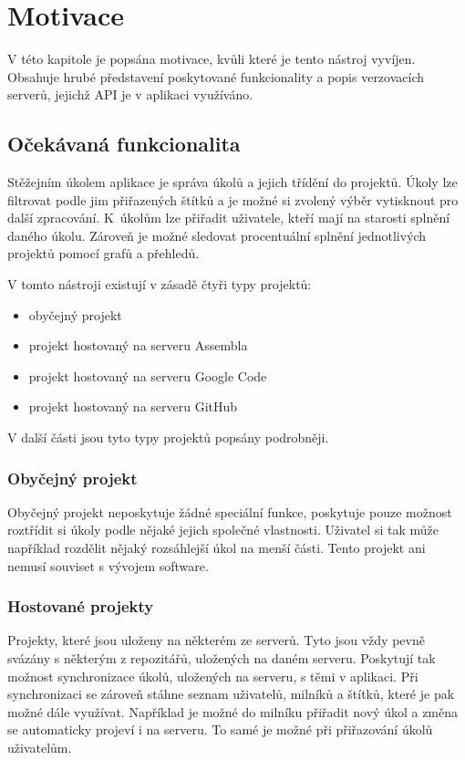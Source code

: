 \chapter{Motivace}

V této kapitole je popsána motivace, kvůli které je tento nástroj vyvíjen. Obsahuje hrubé představení poskytované funkcionality a popis verzovacích serverů, jejichž API je v aplikaci využíváno.

\section{Očekávaná funkcionalita}

Stěžejním úkolem aplikace je správa úkolů a jejich třídění do projektů. Úkoly lze filtrovat podle jim přiřazených štítků a je možné si zvolený výběr vytisknout pro další zpracování. K~úkolům lze přiřadit uživatele, kteří mají na starosti splnění daného úkolu. Zároveň je možné sledovat procentuální splnění jednotlivých projektů pomocí grafů a přehledů.

V tomto nástroji existují v zásadě čtyři typy projektů:

\begin{itemize}
\item obyčejný projekt
\item projekt hostovaný na serveru Assembla
\item projekt hostovaný na serveru Google Code
\item projekt hostovaný na serveru GitHub
\end{itemize}

V další části jsou tyto typy projektů popsány podrobněji.

\subsection{Obyčejný projekt}

Obyčejný projekt neposkytuje žádné speciální funkce, poskytuje pouze možnost roztřídit si úkoly podle nějaké jejich společné vlastnosti. Uživatel si tak může například rozdělit nějaký rozsáhlejší úkol na menší části. Tento projekt ani nemusí souviset s vývojem software.

\subsection{Hostované projekty}

Projekty, které jsou uloženy na některém ze serverů. Tyto jsou vždy pevně svázány s některým z repozitářů, uložených na daném serveru. Poskytují tak možnost synchronizace úkolů, uložených na serveru, s těmi v aplikaci. Při synchronizaci se zároveň stáhne seznam uživatelů, milníků a štítků, které je pak možné dále využívat. Například je možné do milníku přiřadit nový úkol a změna se automaticky projeví i na serveru. To samé je možné při přiřazování úkolů uživatelům.

